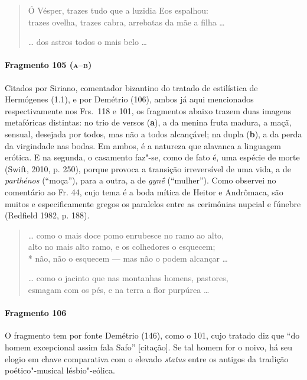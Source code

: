 {\begin{verse}
Ó Vésper, trazes tudo que a luzidia Eos espalhou:\\
trazes ovelha, trazes cabra, arrebatas da mãe a filha \ldots{}

\ast\quad\ast\quad\ast

\ldots{} dos astros todos o mais belo \ldots{} 
\end{verse}


\paragraph{Fragmento 105 (\textsc{a--b})}

{\small Citados por Siriano, comentador bizantino do tratado de estilística de
Hermógenes (1.1), e por Demétrio (106), ambos já aqui mencionados respectivamente nos Frs.~118 e 101, os fragmentos abaixo trazem duas imagens metafóricas distintas: no trio de versos (\textbf{a}), a da menina fruta madura, a maçã, sensual, desejada por todos,
mas não a todos alcançável; na dupla (\textbf{b}), a da perda da virgindade nas bodas.
Em ambos, é a natureza que alavanca a linguagem erótica.
E na segunda, o casamento faz"-se, como de fato é, uma espécie de morte (Swift, 2010, p. 250), porque provoca a transição irreversível de uma vida, a de \textit{parthénos} (``moça''), para a outra, a de \textit{gynḗ } (``mulher''). Como observei no comentário ao Fr. 44, cujo tema é a boda mítica de Heitor e Andrômaca, são muitos e especificamente gregos os paralelos entre as cerimônias nupcial e fúnebre (Redfield 1982, p. 188).}

\begin{verse}
\ldots{} como o mais doce pomo enrubesce no ramo ao \qb{}alto,\\
alto no mais alto ramo, e os colhedores o esquecem;\\*
não, não o esquecem --- mas não o podem alcançar \ldots{}

\ast\quad\ast\quad\ast

\ldots{} como o jacinto que nas montanhas homens, \qb{}pastores,\\
esmagam com os pés, e na terra a flor purpúrea \ldots{}
\end{verse}

\paragraph{Fragmento 106}

{\small O fragmento tem por fonte Demétrio (146), como o 101, cujo tratado diz que
``do homem excepcional assim fala Safo” [citação]. Se tal homem for o
noivo, há seu elogio em chave comparativa com o elevado \textit{status}
entre os antigos da tradição poético"-musical lésbio"-eólica.}

}
